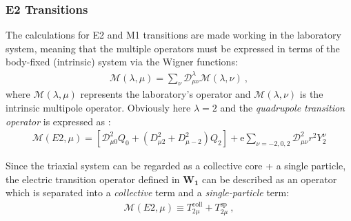 \subsubsection{E2 Transitions}

The calculations for E2 and M1 transitions are made working in the laboratory system, meaning that the multiple operators must be expressed in terms of the body-fixed (intrinsic) system via the Wigner functions:
\begin{align}
    \mathcal{M}(\lambda,\mu)=\sum_\nu\mathcal{D}_{\mu\nu}^\lambda\mathcal{M}(\lambda,\nu)\ ,
    \label{multipole-operator-lab}
\end{align}
where $\mathcal{M}(\lambda,\mu)$ represents the laboratory's operator and $\mathcal{M}(\lambda,\nu)$ is the intrinsic multipole operator. Obviously here $\lambda=2$ and the \emph{quadrupole transition operator} is expressed as \cite{toki1975asymmetric,raduta2020towards}:
\begin{align}
    \mathcal{M}(E2,\mu)=\left[\mathcal{D}_{\mu0}^2Q_0+\left(D_{\mu 2}^2+D_{\mu -2}^2\right)Q_2\right]+\mathrm{e}\sum_{\nu=-2,0,2}\mathcal{D}_{\mu\nu}^2r^2Y_2^\nu
\end{align}

Since the triaxial system can be regarded as a collective core + a single particle, the electric transition operator defined in $\mathbf{W_1}$ can be described as an operator which is separated into a \emph{collective} term and a \emph{single-particle} term:
\begin{align}
    \mathcal{M}(E2,\mu)\equiv T_{2\mu}^\text{coll}+T_{2\mu}^\text{sp}\ ,
    \label{quadrupole-transition-operator-terms}
\end{align}

